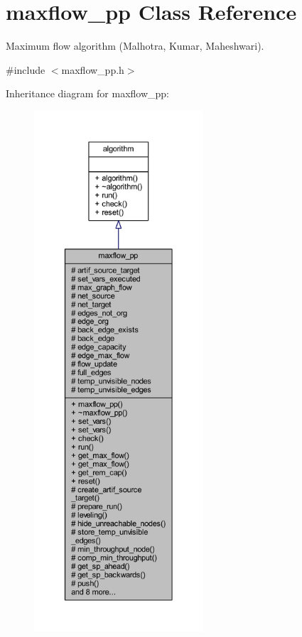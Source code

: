 \hypertarget{classmaxflow__pp}{}\section{maxflow\+\_\+pp Class Reference}
\label{classmaxflow__pp}


Maximum flow algorithm (Malhotra, Kumar, Maheshwari).  




{\ttfamily \#include $<$maxflow\+\_\+pp.\+h$>$}



Inheritance diagram for maxflow\+\_\+pp\+:\nopagebreak
\begin{figure}[H]
\begin{center}
\leavevmode
\includegraphics[height=550pt]{classmaxflow__pp__inherit__graph}
\end{center}
\end{figure}


